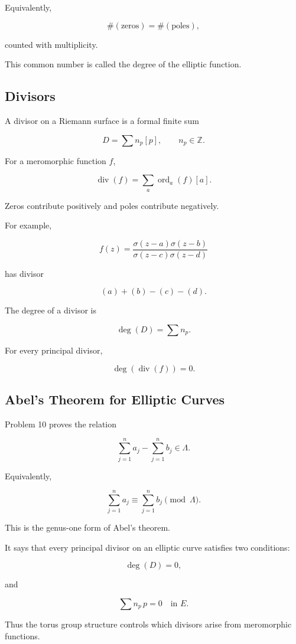 \documentclass[12pt,a4paper]{article}
\theoremstyle{notespace}
\begin{document}
Equivalently,

\[
\#(\text{zeros})
=
\#(\text{poles}),
\]

counted with multiplicity.

This common number is called the degree of the elliptic function.

\subsection{Divisors}

A divisor on a Riemann surface is a formal finite sum

\[
D
=
\sum n_p[p],
\qquad
n_p\in\mathbb Z.
\]

For a meromorphic function \(f\),

\[
\operatorname{div}(f)
=
\sum_a
\operatorname{ord}_a(f)[a].
\]

Zeros contribute positively and poles contribute negatively.

For example,

\[
f(z)
=
\frac{\sigma(z-a)\sigma(z-b)}
{\sigma(z-c)\sigma(z-d)}
\]

has divisor

\[
(a)+(b)-(c)-(d).
\]

The degree of a divisor is

\[
\deg(D)
=
\sum n_p.
\]

For every principal divisor,

\[
\deg(\operatorname{div}(f))
=
0.
\]

\subsection{Abel's Theorem for Elliptic Curves}

Problem 10 proves the relation

\[
\sum_{j=1}^{n}a_j
-
\sum_{j=1}^{n}b_j
\in
\Lambda.
\]

Equivalently,

\[
\sum_{j=1}^{n}a_j
\equiv
\sum_{j=1}^{n}b_j
\pmod{\Lambda}.
\]

This is the genus-one form of Abel's theorem.

It says that every principal divisor on an elliptic curve satisfies two conditions:

\[
\deg(D)=0,
\]

and

\[
\sum n_p\,p
=
0
\quad\text{in }E.
\]

Thus the torus group structure controls which divisors arise from meromorphic functions.
\end{document}
